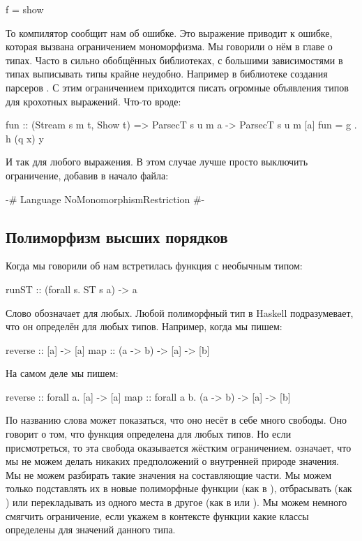 \begin{code}
f = show
\end{code}

То компилятор сообщит нам об ошибке. Это выражение приводит
к ошибке, которая вызвана ограничением мономорфизма. 
Мы говорили о нём в главе о типах.
Часто в сильно обобщённых библиотеках, с большими зависимостями в типах
выписывать типы крайне неудобно. Например в библиотеке
создания парсеров . С этим ограничением 
приходится писать огромные объявления типов
для крохотных выражений. Что-то вроде:

\begin{code}
fun :: (Stream s m t, Show t) => ParsecT s u m a -> ParsecT s u m [a]
fun = g . h (q x) y
\end{code}

И так для любого выражения. В этом случае лучше просто выключить
ограничение, добавив в начало файла:

\begin{code}
{-# Language NoMonomorphismRestriction #-}
\end{code}

\subsection{Полиморфизм высших порядков}

Когда мы говорили об  нам встретилась
функция с необычным типом:

\begin{code}
runST :: (forall s. ST s a) -> a
\end{code}

Слово  обозначает для любых. Любой полиморфный
тип в Haskell подразумевает, что он определён для любых
типов. Например, когда мы пишем:

\begin{code}
reverse :: [a] -> [a]
map     :: (a -> b) -> [a] -> [b]
\end{code}

\noindent На самом деле мы пишем:

\begin{code}
reverse :: forall a. [a] -> [a]
map     :: forall a b. (a -> b) -> [a] -> [b]
\end{code}

По названию слова  может показаться, что 
оно несёт в себе много свободы. Оно говорит о
том, что функция определена для любых типов. Но если
присмотреться, то эта свобода оказывается жёстким 
ограничением.  означает, что мы 
не можем делать никаких предположений о внутренней
природе значения. Мы не можем разбирать такие значения
на составляющие части. Мы можем только подставлять 
их в новые полиморфные функции (как в ),
отбрасывать (как ) или перекладывать 
из одного места в другое (как в  или ).
Мы можем немного смягчить ограничение, если 
укажем в контексте функции какие классы определены
для значений данного типа. 

